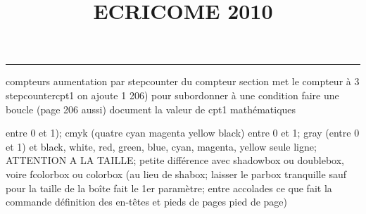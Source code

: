 \documentclass[11pt]{article}%
\title{\bf \vspace{-2cm} ECRICOME 2010} %
\author{} %
\date{} %
\renewcommand{\headrulewidth}{0pt}%
\renewcommand{\footrulewidth}{0.4pt}%
\begin{document}
\maketitle %
\vspace{-1.4cm}\hrule %
\thispagestyle{fancy}

\vspace*{.2cm}



compteurs%
aumentation par stepcounter du compteur section%
met le compteur à 3%
stepcounter{cpt1} on ajoute 1%
206) pour subordonner à une condition %
faire une boucle (page 206 aussi) %
document la valeur de cpt1 
mathématiques\newcommand{\ch}{\operatorname{ch}} 
\newcommand{\sh}{\operatorname{sh}}
\renewcommand{\tanh}{\operatorname{th}}
\renewcommand{\sinh}{\operatorname{sh}}
\renewcommand{\cosh}{\operatorname{ch}}
\newcommand{\argsh}{\operatorname{argsh}}
\newcommand{\argch}{\operatorname{argch}}
\newcommand{\argth}{\operatorname{argth}}
\newcommand{\Id}{\operatorname{Id}}
\renewcommand{\leq}{\leq}
\renewcommand{\geq}{\geq }

\newcommand{\dlim}{\lim}
\newcommand{\dsum}{\sum}
\newcommand{\dprod}{\prod}



entre 0 et 1); cmyk (quatre cyan magenta yellow black) entre 0 et 1;
gray (entre 0 et 1) et black, white, red, green, blue, cyan, magenta,
yellow%
seule ligne; ATTENTION A LA TAILLE; petite différence avec shadowbox ou
doublebox, voire fcolorbox ou colorbox (au lieu de shabox; laisser le
parbox tranquille sauf pour la taille de la boîte
\newcommand{\Tbox}[1]{\begin{center} \shabox{\parbox{0.6
\linewidth}{#1}} \end{center}} %
fait le 1er paramètre; entre accolades ce que fait la commande
définition des en-têtes et pieds de pages\pagestyle{fancy}
\chead{}
\rfoot[ \ \thepage]{\thepage}
\cfoot{}
\lfoot{}
\thispagestyle{fancy} %
pied de page)\renewcommand{\footrulewidth}{0.4pt}
\renewcommand{\headrulewidth}{0.4pt}
\end{document}
